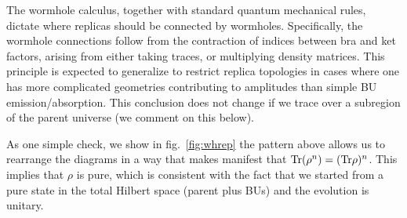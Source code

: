 \documentclass[12pt]{article}
\numberwithin{equation}{section}
\begin{document}
The wormhole calculus, together with standard quantum mechanical rules, dictate where replicas should be connected by wormholes.  Specifically, the wormhole connections follow from the contraction of indices between bra and ket factors, arising from either taking traces, or multiplying density matrices.
This principle is  expected to generalize to restrict replica topologies in cases where one has more complicated geometries contributing to amplitudes than simple BU emission/absorption. This conclusion does not change if we trace over a subregion of the parent universe (we comment on this below).

As one simple check, we show in fig.~\ref{fig:whrep} the pattern above allows us to rearrange the diagrams in a way that makes manifest that ${\rm Tr}(\rho^n)=({\rm Tr} \rho)^n$. This implies that $\rho$ is pure, which is consistent with the fact that we started from a pure state in the total Hilbert space (parent plus BUs) and the evolution is unitary. 
\end{document}
